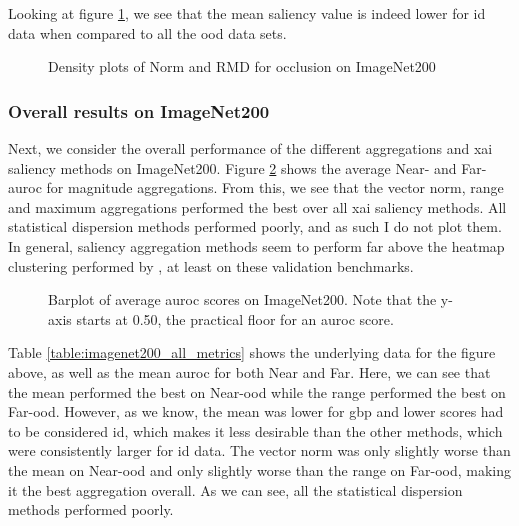 \documentclass[UKenglish]{uiomasterthesis} %
\theoremstyle{definition}
\begin{document}
Looking at figure \ref{fig:imagenet200_gbp_mean_full}, we see that the mean saliency value is indeed lower for \ac{id} data when compared to all the \ac{ood} data sets.

\begin{figure}[H]
    \begin{center}
        
    \end{center}
    \caption[Density plots of Norm and RMD for occlusion on ImageNet200]{Density plots of Norm and RMD for occlusion on ImageNet200}
    \label{fig:imagenet200_gbp_mean_full}
\end{figure}

\subsubsection{Overall results on ImageNet200}

Next, we consider the overall performance of the different aggregations and \ac{xai} saliency methods on ImageNet200. Figure \ref{fig:imagenet200_all_metrics_barplot} shows the average Near- and Far-\ac{auroc} for magnitude aggregations. From this, we see that the vector norm, range and maximum aggregations performed the best over all \ac{xai} saliency methods. All statistical dispersion methods performed poorly, and as such I do not plot them. In general, saliency aggregation methods seem to perform far above the heatmap clustering performed by \cite{martinez}, at least on these validation benchmarks.

\begin{figure}[H]
    \begin{center}
        
    \end{center}
    \caption[Average scores]{Barplot of average \ac{auroc} scores on ImageNet200. Note that the y-axis starts at 0.50, the practical floor for an \ac{auroc} score.}
    \label{fig:imagenet200_all_metrics_barplot}
\end{figure}


Table \ref{table:imagenet200_all_metrics} shows the underlying data for the figure above, as well as the mean \ac{auroc} for both Near and Far. Here, we can see that the mean performed the best on Near-\ac{ood} while the range performed the best on Far-\ac{ood}. However, as we know, the mean was lower for \ac{gbp} and lower scores had to be considered \ac{id}, which makes it less desirable than the other methods, which were consistently larger for \ac{id} data. The vector norm was only slightly worse than the mean on Near-\ac{ood} and only slightly worse than the range on Far-\ac{ood}, making it the best aggregation overall. As we can see, all the statistical dispersion methods performed poorly.
\end{document}
